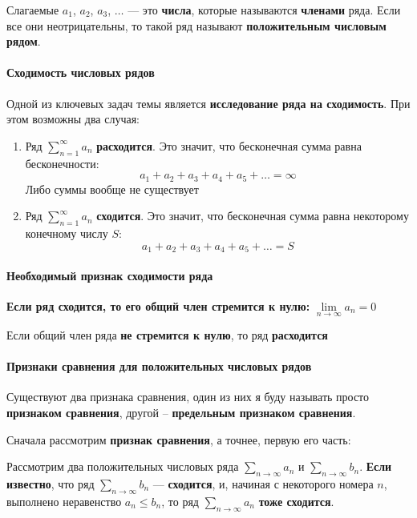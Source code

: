 \documentclass{article}
\begin{document}
Слагаемые $a_{1}$, $a_{2}$, $a_{3}$, $\dots$ — это \textbf{числа}, которые называются \textbf{членами} ряда. Если все они неотрицательны, то такой ряд называют \textbf{положительным числовым рядом}.

\paragraph{Сходимость числовых рядов}

Одной из ключевых задач темы является \textbf{исследование ряда на сходимость}. При этом возможны два случая:

\begin{enumerate}
    \item Ряд $\sum\limits_{n = 1}^{\infty} a_{n}$ \textbf{расходится}. Это значит, что бесконечная сумма равна бесконечности:
    $$a_{1} + a_{2} + a_{3} + a_{4} + a_{5} + \dots = \infty$$
    Либо суммы вообще не существует
    \item Ряд $\sum\limits_{n = 1}^{\infty} a_{n}$ \textbf{сходится}. Это значит, что бесконечная сумма равна некоторому конечному числу $S$:
    $$a_{1} + a_{2} + a_{3} + a_{4} + a_{5} + \dots = S$$
\end{enumerate}
    
\paragraph{Необходимый признак сходимости ряда}

\textbf{Если ряд сходится, то его общий член стремится к нулю:} $\lim\limits_{n \to \infty} a_{n} = 0$

Если общий член ряда \textbf{не стремится к нулю}, то ряд \textbf{расходится}

\paragraph{Признаки сравнения для положительных числовых рядов}

Существуют два признака сравнения, один из них я буду называть просто \textbf{признаком сравнения}, другой – \textbf{предельным признаком сравнения}.

\hfill

Сначала рассмотрим \textbf{признак сравнения}, а точнее, первую его часть:

Рассмотрим два положительных числовых ряда $\sum\limits_{n \to \infty} a_{n}$ и $\sum\limits_{n \to \infty} b_{n}$. \textbf{Если известно}, что ряд $\sum\limits_{n \to \infty} b_{n}$ — \textbf{сходится}, и, начиная с некоторого номера $n$, выполнено неравенство $a_{n} \le b_{n}$, то ряд $\sum\limits_{n \to \infty} a_{n}$ \textbf{тоже сходится}.
\end{document}
